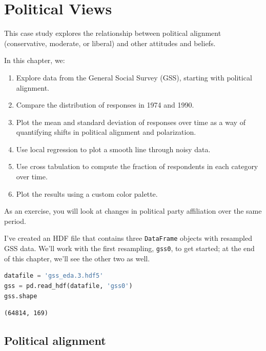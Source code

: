 \hypertarget{political-views}{%
\chapter{Political Views}\label{political-views}}

This case study explores the relationship between political alignment
(conservative, moderate, or liberal) and other attitudes and beliefs.

In this chapter, we:

\begin{enumerate}
\def\labelenumi{\arabic{enumi}.}
\item
  Explore data from the General Social Survey (GSS), starting with
  political alignment.
\item
  Compare the distribution of responses in 1974 and 1990.
\item
  Plot the mean and standard deviation of responses over time as a way
  of quantifying shifts in political alignment and polarization.
\item
  Use local regression to plot a smooth line through noisy data.
\item
  Use cross tabulation to compute the fraction of respondents in each
  category over time.
\item
  Plot the results using a custom color palette.
\end{enumerate}

As an exercise, you will look at changes in political party affiliation
over the same period.

I've created an HDF file that contains three
\passthrough{\lstinline!DataFrame!} objects with resampled GSS data.
We'll work with the first resampling, \passthrough{\lstinline!gss0!}, to
get started; at the end of this chapter, we'll see the other two as
well.

\begin{lstlisting}[language=Python]
datafile = 'gss_eda.3.hdf5'
gss = pd.read_hdf(datafile, 'gss0')
gss.shape
\end{lstlisting}

\begin{lstlisting}[]
(64814, 169)
\end{lstlisting}

\hypertarget{political-alignment}{%
\section{Political alignment}\label{political-alignment}}

